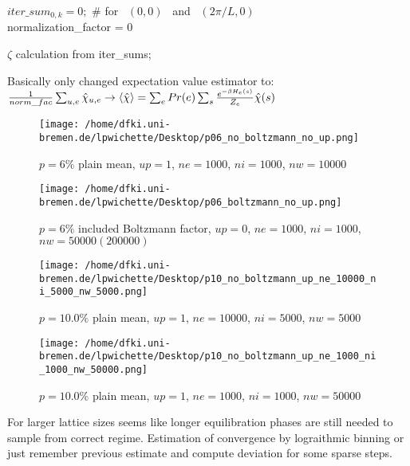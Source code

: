 \documentclass{article}
\begin{document}
\begin{algorithm}

$iter\_sum_{0, k} = 0;$ \qquad \# for~ $(0, 0)$ ~and~ $(2\pi/L, 0)$\\
normalization\_factor = 0\;

$\zeta$ calculation from iter\_sums;\

\end{algorithm}


Basically only changed expectation value estimator to:
$\frac{1}{norm\_fac}\sum_{u, e}\hat{\chi}_{u, e} \rightarrow \braket{\hat{\chi}}=\sum_{e}Pr(e)\sum_{s}\frac{e^{-\beta H_{e}(s)}}{Z_{e}}\hat{\chi}(s)$

\begin{figure}[h!]

  \begin{minipage}{0.5\linewidth}
    \centering
    \texttt{[image: /home/dfki.uni-bremen.de/lpwichette/Desktop/p06\_no\_boltzmann\_no\_up.png]}
    \caption{$p=6\%$ plain mean, $up=1$, $ne=1000$, $ni=1000$, $nw=10000$}
  \end{minipage}%
  \begin{minipage}{0.5\linewidth}
    \centering
    \texttt{[image: /home/dfki.uni-bremen.de/lpwichette/Desktop/p06\_boltzmann\_no\_up.png]}
    \caption{$p=6\%$ included Boltzmann factor, $up=0$, $ne=1000$, $ni=1000$, $nw=50000(200000)$}
  \end{minipage}

\end{figure}

\begin{figure}[h!]
  \begin{minipage}{0.5\textwidth}
    \centering
    \texttt{[image: /home/dfki.uni-bremen.de/lpwichette/Desktop/p10\_no\_boltzmann\_up\_ne\_10000\_ni\_5000\_nw\_5000.png]}
    \caption{$p=10.0\%$ plain mean, $up=1$, $ne=10000$, $ni=5000$, $nw=5000$}
  \end{minipage}%
  \begin{minipage}{0.5\textwidth}
    \centering
    \texttt{[image: /home/dfki.uni-bremen.de/lpwichette/Desktop/p10\_no\_boltzmann\_up\_ne\_1000\_ni\_1000\_nw\_50000.png]}
    \caption{$p=10.0\%$ plain mean, $up=1$, $ne=1000$, $ni=1000$, $nw=50000$}
  \end{minipage}
\end{figure}

For larger lattice sizes seems like longer equilibration phases are still needed to sample from correct regime.
Estimation of convergence by lograithmic binning or just remember previous estimate and compute deviation for some sparse steps.
\end{document}
